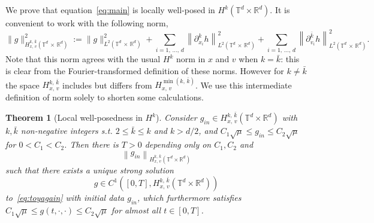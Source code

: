 \documentclass[10pt]{amsart}
\newtheorem{theo}{Theorem}[section]
\theoremstyle{definition}\newtheorem{defi}[theo]{Definition}\newtheorem{rema}[theo]{Remark}\newtheorem{exam}[theo]{Example}\newtheorem{exem}[theo]{Example}\newtheorem{nota}[theo]{Notation}
\newcommand{\R}{\mathbb{R}}
\newcommand{\T}{\mathbb{T}}
\begin{document}
We prove that equation~\eqref{eq:main} is locally well-posed in $H^k (\T^d \times \R^d)$. It is convenient to work with the following norm,
\[
\| g \|_{H^{k,\,\bar k}_{x,\,v}\left(\T^d\,\times\,\R^d\right)} ^2 := \| g \|_{L^2\left(\T^d\,\times\,\R^d\right)} ^2 + \sum_{i=1,\,\dots,\,d} \left\| \partial_{x_i} ^k h\right\|_{L^2\left(\T^d\,\times\,\R^d\right)}^2 + \sum_{i=1,\,\dots,\,d} \left\| \partial_{v_i} ^{\bar k} h\right\|_{L^2\left(\T^d\,\times\,\R^d\right)}^2.
\]
Note that this norm agrees with the usual $H^k$ norm in $x$ and $v$ when $k = \bar k$: this is clear from the Fourier-transformed definition of these norms. However for $k \not = \bar k$ the space $H^{k,\,\bar k}_{x,\,v}$ includes but differs from $H^{\min(k,\,\bar k)}_{x,\,v}$. We use this intermediate definition of norm solely to shorten some calculations.


\begin{theo}[Local well-posedness in $H^k$]\label{t:loc-exis}
Consider
$
g_{in} \in H^{k,\,\bar k}_{x,\,v}(\T^d \times \R^d)
$
with $k,{\bar k}$ non-negative integers s.t. $2 \le{\bar k} \le k$ and $k > d/2$, and $C_1 \sqrt{\mu} \le g_{in} \le C_2 \sqrt{\mu}$ for $0 < C_1 < C_2$. Then there is $T>0$ depending only on $C_1, C_2$ and
\[
\left\|g_{in}\right\|_{H^{k,\,\bar k}_{x,\,v}\left(\T^d \times \R^d\right)}
\]
such that there exists a unique strong solution
\[
g \in C^1\left([0,T],H^{k,\,\bar k}_{x,\,v}\left(\T^d \times \R^d\right)\right)
\]
to~\eqref{eq:toyagain} with initial data $g_{in}$, which furthermore satisfies $C_1 \sqrt{\mu} \le g (t,\cdot,\cdot) \le C_2 \sqrt{\mu}$ for almost all $t \in [0,T]$.
\end{theo}
\end{document}
